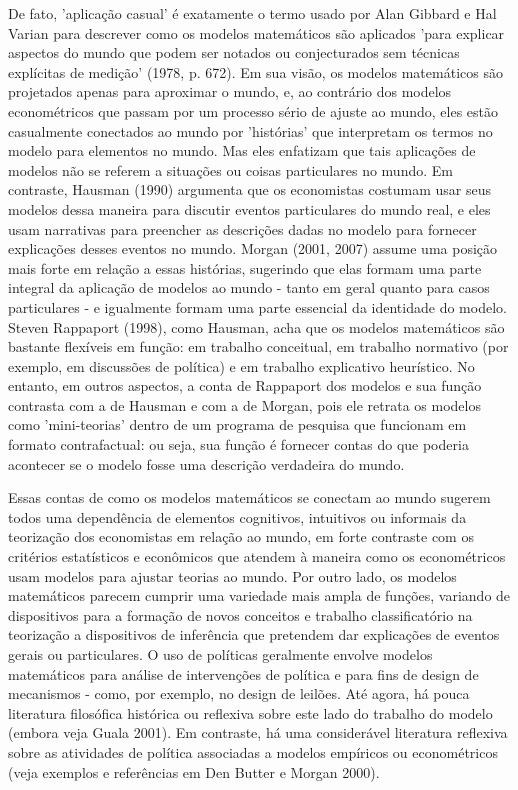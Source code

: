 \documentclass[12pt]{article}
\begin{document}
De fato, 'aplicação casual' é exatamente o termo usado por Alan Gibbard e Hal Varian para descrever como os modelos matemáticos são aplicados 'para explicar aspectos do mundo que podem ser notados ou conjecturados sem técnicas explícitas de medição' (1978, p. 672). Em sua visão, os modelos matemáticos são projetados apenas para aproximar o mundo, e, ao contrário dos modelos econométricos que passam por um processo sério de ajuste ao mundo, eles estão casualmente conectados ao mundo por 'histórias' que interpretam os termos no modelo para elementos no mundo. Mas eles enfatizam que tais aplicações de modelos não se referem a situações ou coisas particulares no mundo. Em contraste, Hausman (1990) argumenta que os economistas costumam usar seus modelos dessa maneira para discutir eventos particulares do mundo real, e eles usam narrativas para preencher as descrições dadas no modelo para fornecer explicações desses eventos no mundo. Morgan (2001, 2007) assume uma posição mais forte em relação a essas histórias, sugerindo que elas formam uma parte integral da aplicação de modelos ao mundo - tanto em geral quanto para casos particulares - e igualmente formam uma parte essencial da identidade do modelo. Steven Rappaport (1998), como Hausman, acha que os modelos matemáticos são bastante flexíveis em função: em trabalho conceitual, em trabalho normativo (por exemplo, em discussões de política) e em trabalho explicativo heurístico. No entanto, em outros aspectos, a conta de Rappaport dos modelos e sua função contrasta com a de Hausman e com a de Morgan, pois ele retrata os modelos como 'mini-teorias' dentro de um programa de pesquisa que funcionam em formato contrafactual: ou seja, sua função é fornecer contas do que poderia acontecer se o modelo fosse uma descrição verdadeira do mundo.

Essas contas de como os modelos matemáticos se conectam ao mundo sugerem todos uma dependência de elementos cognitivos, intuitivos ou informais da teorização dos economistas em relação ao mundo, em forte contraste com os critérios estatísticos e econômicos que atendem à maneira como os econométricos usam modelos para ajustar teorias ao mundo. Por outro lado, os modelos matemáticos parecem cumprir uma variedade mais ampla de funções, variando de dispositivos para a formação de novos conceitos e trabalho classificatório na teorização a dispositivos de inferência que pretendem dar explicações de eventos gerais ou particulares. O uso de políticas geralmente envolve modelos matemáticos para análise de intervenções de política e para fins de design de mecanismos - como, por exemplo, no design de leilões. Até agora, há pouca literatura filosófica histórica ou reflexiva sobre este lado do trabalho do modelo (embora veja Guala 2001). Em contraste, há uma considerável literatura reflexiva sobre as atividades de política associadas a modelos empíricos ou econométricos (veja exemplos e referências em Den Butter e Morgan 2000).
\end{document}
